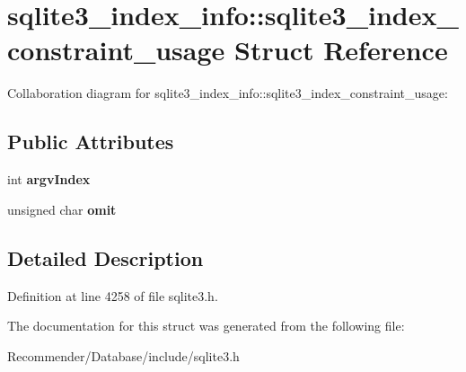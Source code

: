 \section{sqlite3\_\-index\_\-info::sqlite3\_\-index\_\-constraint\_\-usage Struct Reference}
\label{structsqlite3__index__info_1_1sqlite3__index__constraint__usage}
Collaboration diagram for sqlite3\_\-index\_\-info::sqlite3\_\-index\_\-constraint\_\-usage:\subsection*{Public Attributes}
\begin{CompactItemize}
\item 
int {\bf argvIndex}\label{structsqlite3__index__info_1_1sqlite3__index__constraint__usage_71527e0209c0464b952e54100f515e4e}

\item 
unsigned char {\bf omit}\label{structsqlite3__index__info_1_1sqlite3__index__constraint__usage_d5b08c06721b109a4a619a7ce0a1a3e2}

\end{CompactItemize}


\subsection{Detailed Description}




Definition at line 4258 of file sqlite3.h.

The documentation for this struct was generated from the following file:\begin{CompactItemize}
\item 
Recommender/Database/include/sqlite3.h\end{CompactItemize}
